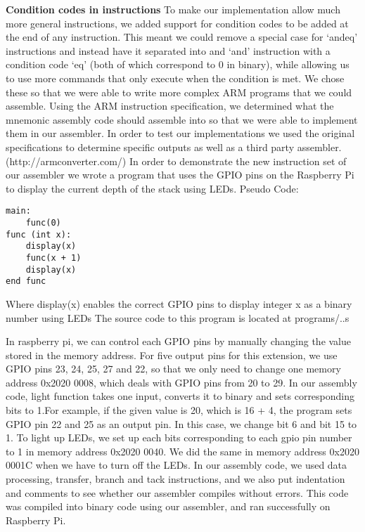 \documentclass[a4paper]{article}
\begin{document}
\textbf{Condition codes in instructions} \newline
To make our implementation allow much more general instructions, we added support for condition codes to be added at the end of any instruction. This meant we could remove a special case for ‘andeq’ instructions and instead have it separated into and ‘and’ instruction with a condition code ‘eq’ (both of which correspond to 0 in binary), while allowing us to use more commands that only execute when the condition is met.\newline
\bigskip
We chose these so that we were able to write more complex ARM programs that we could assemble. Using the ARM instruction specification, we determined what the mnemonic assembly code should assemble into so that we were able to implement them in our assembler. In order to test our implementations we used the original specifications to determine specific outputs as well as a third party assembler. (http://armconverter.com/)
In order to demonstrate the new instruction set of our assembler we wrote a program that uses the GPIO pins on the Raspberry Pi to display the current depth of the stack using LEDs.
Pseudo Code:
\begin{lstlisting}
main:
    func(0) 
func (int x):
    display(x)
    func(x + 1)
    display(x)
end func
\end{lstlisting}

Where display(x) enables the correct GPIO pins to display integer x as a binary number using LEDs
The source code to this program is located at programs/..s

In raspberry pi, we can control each GPIO pins by manually changing the value stored in the memory address. For five output pins for this extension, we use GPIO pins 23, 24, 25, 27 and 22, so that we only need to change one memory address 0x2020 0008, which deals with GPIO pins from 20 to 29. In our assembly code, light function takes one input, converts it to binary and sets corresponding bits to 1.For example, if the given value is 20, which is 16 + 4, the program sets GPIO pin 22 and 25 as an output pin. In this case, we change bit 6 and bit 15 to 1. To light up LEDs, we set up each bits corresponding to each gpio pin number to 1 in memory address 0x2020 0040. We did the same in memory address 0x2020 0001C when we have to turn off the LEDs.
In our assembly code, we used data processing, transfer, branch and tack instructions, and we also put indentation and comments to see whether our assembler compiles without errors. This code was compiled into binary code using our assembler, and ran successfully on Raspberry Pi.
\end{document}
